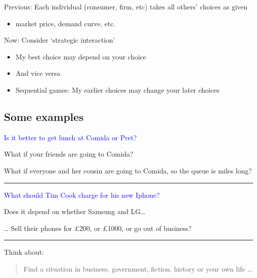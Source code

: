 \documentclass[]{article}
\providecommand{\tightlist}{%
  \setlength{\itemsep}{0pt}\setlength{\parskip}{0pt}}
\begin{document}
Previous: Each individual (consumer, firm, etc) takes all others' choices as given

\begin{itemize}
\tightlist
\item
  market price, demand curve, etc.
\end{itemize}

\bigskip

Now: Consider `strategic interaction'

\begin{itemize}
\tightlist
\item
  My best choice may depend on your choice
\item
  And vice versa
\item
  Sequential games: My earlier choices may change your later choices
\end{itemize}

\hypertarget{some-examples}{%
\subsection{Some examples}\label{some-examples}}

\textcolor{blue}{Is it better to get lunch at Comida or Pret?}

\bigskip

What if your friends are going to Comida?

\bigskip

What if everyone and her cousin are going to Comida, so the queue is miles long?

\begin{center}\rule{0.5\linewidth}{\linethickness}\end{center}

\textcolor{blue}{What should Tim Cook charge for his new Iphone?}

\bigskip

Does it depend on whether Samsung and LG\ldots{}

\ldots{} Sell their phones for £200, or £1000, or go out of business?

\begin{center}\rule{0.5\linewidth}{\linethickness}\end{center}

Think about:

\begin{quote}
Find a situation in business, government, fiction, history or your own life \ldots{}
\end{quote}
\end{document}
